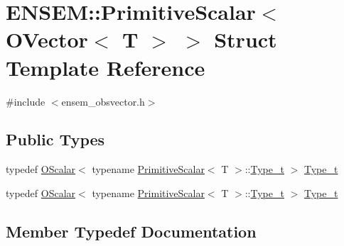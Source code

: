 \hypertarget{structENSEM_1_1PrimitiveScalar_3_01OVector_3_01T_01_4_01_4}{}\section{E\+N\+S\+EM\+:\+:Primitive\+Scalar$<$ O\+Vector$<$ T $>$ $>$ Struct Template Reference}
\label{structENSEM_1_1PrimitiveScalar_3_01OVector_3_01T_01_4_01_4}


{\ttfamily \#include $<$ensem\+\_\+obsvector.\+h$>$}

\subsection*{Public Types}
\begin{DoxyCompactItemize}
\item 
typedef \mbox{\hyperlink{classENSEM_1_1OScalar}{O\+Scalar}}$<$ typename \mbox{\hyperlink{structENSEM_1_1PrimitiveScalar}{Primitive\+Scalar}}$<$ T $>$\+::\mbox{\hyperlink{structENSEM_1_1PrimitiveScalar_3_01OVector_3_01T_01_4_01_4_adf4731d74a76b08e5cc003ad658050b0}{Type\+\_\+t}} $>$ \mbox{\hyperlink{structENSEM_1_1PrimitiveScalar_3_01OVector_3_01T_01_4_01_4_adf4731d74a76b08e5cc003ad658050b0}{Type\+\_\+t}}
\item 
typedef \mbox{\hyperlink{classENSEM_1_1OScalar}{O\+Scalar}}$<$ typename \mbox{\hyperlink{structENSEM_1_1PrimitiveScalar}{Primitive\+Scalar}}$<$ T $>$\+::\mbox{\hyperlink{structENSEM_1_1PrimitiveScalar_3_01OVector_3_01T_01_4_01_4_adf4731d74a76b08e5cc003ad658050b0}{Type\+\_\+t}} $>$ \mbox{\hyperlink{structENSEM_1_1PrimitiveScalar_3_01OVector_3_01T_01_4_01_4_adf4731d74a76b08e5cc003ad658050b0}{Type\+\_\+t}}
\end{DoxyCompactItemize}


\subsection{Member Typedef Documentation}
\mbox{\label{structENSEM_1_1PrimitiveScalar_3_01OVector_3_01T_01_4_01_4_adf4731d74a76b08e5cc003ad658050b0}} 
